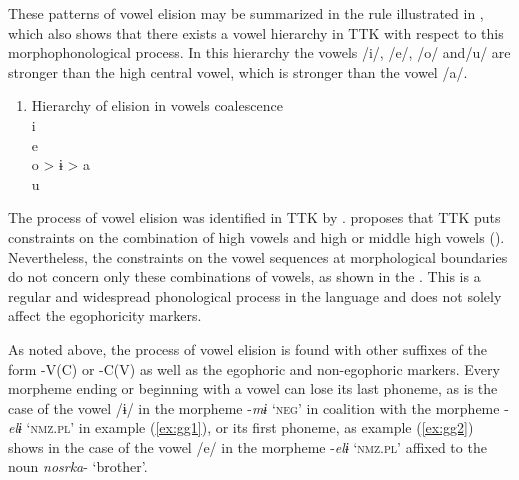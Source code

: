\documentclass[output=paper]{langsci/langscibook}
\begin{document}
These patterns of vowel elision may be summarized in the rule illustrated in , which also shows that there exists a vowel hierarchy in TTK with respect to this morphophonological process. In this hierarchy the vowels /i/, /e/, /o/ and/u/ are stronger than the high central vowel, which is stronger than the vowel /a/.



\begin{enumerate}
    \item Hierarchy of elision in vowels coalescence \label{fig:gg1}\\
    i \\
    e \\
    o  > ɨ  > a\\
    u
\end{enumerate}{}



The process of vowel elision was identified in TTK by \citet{Pabon1989}. \citeauthor{Pabon1989} proposes that TTK puts constraints on the combination of high vowels and high or middle high vowels (\citeyear[16]{Pabon1989}). Nevertheless, the constraints on the vowel sequences at morphological boundaries do not concern only these combinations of vowels, as shown in the . This is a regular and widespread phonological process in the language and does not solely affect the egophoricity markers.

As noted above, the process of vowel elision is found with other suffixes of the form -V(C) or -C(V) as well as the egophoric and non-egophoric markers. Every morpheme ending or beginning with a vowel can lose its last phoneme, as is the case of the vowel /ɨ/ in the morpheme -\textit{mɨ} ‘\textsc{neg}’ in coalition with the morpheme -\textit{elɨ} ‘\textsc{nmz.pl}’ in example (\ref{ex:gg1}), or its first phoneme, as example (\ref{ex:gg2}) shows in the case of the vowel /e/ in the morpheme -\textit{elɨ} ‘\textsc{nmz.pl}’ affixed to the noun \textit{nosrka}- ‘brother’.
 \newpage
\end{document}

